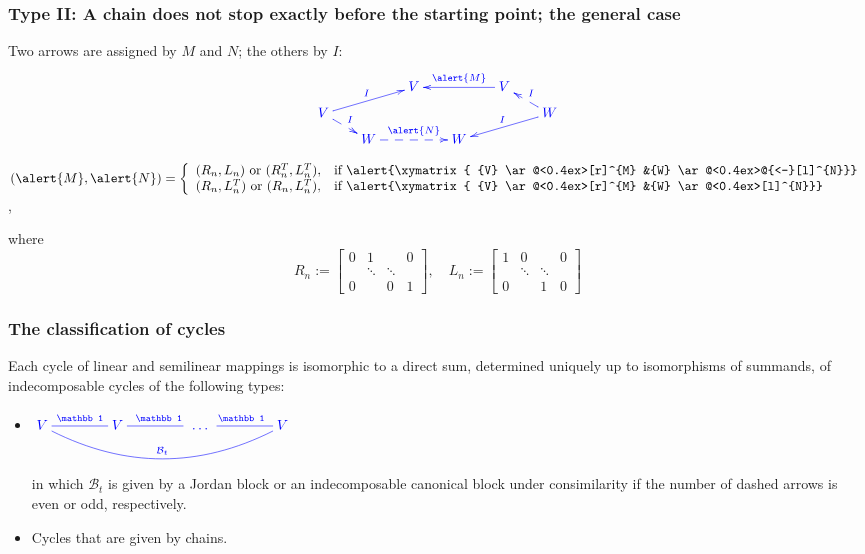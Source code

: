 \documentclass[usenames,dvipsnames]{beamer}
\begin{document}
\begin{frame}
\frametitle{Type II: A chain does not
stop exactly before the starting point;
the general case}%


Two arrows are assigned by $M$ and $N$;
the others by $I$:
\[
\textcolor{blue}{\xymatrix@R=6pt@C=17pt{
&&V\ar@{<-}[rr]^{\alert{M}}&&
V\ar@{<--}[dr]^{I}&\\
V\ar@{->}[urr]^{I}&&&&&
W\ar@{->}[dll]_{I}\\
&W\ar@{<--}[ul]_{I}&&
W\ar@{<--}[ll]_{\alert{N}}&&\\}}
\]

$ (\alert{M},\alert{N})=\left\{
          \begin{array}{ll}
            (R_n,L_n)\text{ or }
(R_n^T,L_n^T), & \hbox{if }
\alert{\xymatrix{
 {V}
 \ar@<0.4ex>[r]^{M}
 &{W}
 \ar@<0.4ex>@{<-}[l]^{N}}}
\\
            (R_n,L_n^T)\text{ or }
(R_n,L_n^T), &
\hbox{if }
\alert{\xymatrix{
 {V}
 \ar@<0.4ex>[r]^{M}
 &{W}
 \ar@<0.4ex>[l]^{N}}}
          \end{array}
        \right.
$,

where \[R_n:=\left[\begin{smallmatrix}
0&1&&0\\&\ddots&\ddots&\\0&&0&1
\end{smallmatrix}\right],\quad
L_n:=\left[\begin{smallmatrix}
1&0&&0\\&\ddots&\ddots&\\0&&1&0
\end{smallmatrix}\right]
\]
\end{frame}








\begin{frame}

\frametitle{The classification of
cycles}

\begin{theorem}
Each cycle of linear and semilinear
mappings is isomorphic to a direct sum,
determined uniquely up to isomorphisms
of summands, of indecomposable cycles
of the following types:
\begin{itemize}
  \item %
 $\textcolor{blue}{ \xymatrix
@C=40pt{
     V
\ar@{-}@/_2.0pc/[rrr]^{
\mathcal B_t }
\ar@{-}[r]^{\mathbb 1}
         &
     V
\ar@{-}[r]^{\mathbb 1}
         &
{\ \dots\ }
         &V
\ar@{-}[l]_{\mathbb 1}
}}
$
\medskip

in which \alert{$ \mathcal B_t $ is
given by a Jordan block or an
indecomposable canonical block
under consimilarity} if the number
of dashed arrows is \alert{even or
odd, respectively}.\medskip

  \item Cycles that are given by
      chains.

\end{itemize}

\end{theorem}

\end{frame}
\end{document}
